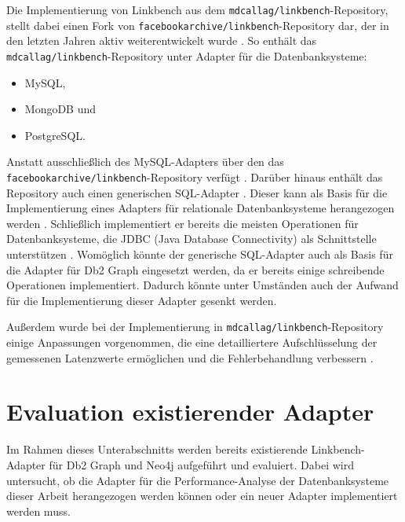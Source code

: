 Die Implementierung von Linkbench aus dem \texttt{mdcallag/linkbench}-Repository, stellt dabei einen Fork von \texttt{facebookarchive\allowbreak /linkbench}-Repository dar, der in den letzten Jahren aktiv weiterentwickelt wurde \cite{mc_linkbench_github}. So enthält das \texttt{mdcallag/linkbench}-Repository unter \cite{mc_linkbench_github} Adapter für die Datenbanksysteme: 
\begin{itemize}
    \item MySQL,
    \item MongoDB und
    \item PostgreSQL.
\end{itemize}
Anstatt ausschließlich des MySQL-Adapters über den das \texttt{facebookarchive/\break linkbench}-Repository verfügt \cite{mc_linkbench_github}. Darüber hinaus enthält das Repository auch einen generischen SQL-Adapter \cite{mc_linkbench_github}. Dieser kann als Basis für die Implementierung eines Adapters für relationale Datenbanksysteme herangezogen werden \cite{mc_linkbench_github}. Schließlich implementiert er bereits die meisten Operationen für Datenbanksysteme, die JDBC (Java Database Connectivity) als Schnittstelle unterstützen \cite{mc_linkbench_github}. Womöglich könnte der generische SQL-Adapter auch als Basis für die Adapter für Db2 Graph eingesetzt werden, da er bereits einige schreibende Operationen implementiert. Dadurch könnte unter Umständen auch der Aufwand für die Implementierung dieser Adapter gesenkt werden.

Außerdem wurde bei der Implementierung in \texttt{mdcallag/linkbench}-Repository einige Anpassungen vorgenommen, die eine detailliertere Aufschlüsselung der gemessenen Latenzwerte ermöglichen und die Fehlerbehandlung verbessern \cite{mc_linkbench_github}.

\section{Evaluation existierender Adapter}
\label{implementierung:evaluation}
Im Rahmen dieses Unterabschnitts werden bereits existierende Linkbench-Adapter für Db2 Graph und Neo4j aufgeführt und evaluiert. Dabei wird untersucht, ob die Adapter für die Performance-Analyse der Datenbanksysteme dieser Arbeit herangezogen werden können oder ein neuer Adapter implementiert werden muss. 

